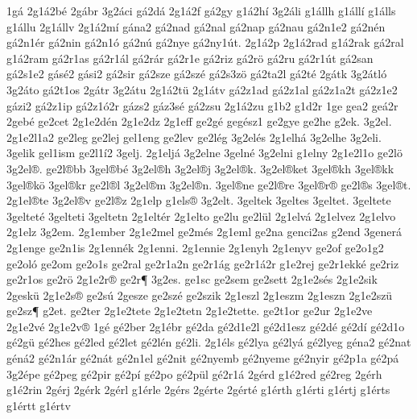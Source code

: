 {1g^^e1
2g1^^e12b^^e9
2g^^e1br
3g2^^e1ci
g^^e12d^^e1
2g1^^e12f
g^^e12gy
g1^^e12h^^ed
3g2^^e1li
g1^^e1llh
g1^^e1ll^^ed
g1^^e1lls
g1^^e1llu
2g1^^e1llv
2g1^^e12m^^ed
g^^e1na2
g^^e12nad
g^^e12nal
g^^e12nap
g^^e12nau
g^^e12n1e2
g^^e12n^^e9n
g^^e12n1^^e9r
g^^e12nin
g^^e12n1^^f3
g^^e12n^^fa
g^^e12nye
g^^e12ny1^^fat.
2g1^^e12p
2g1^^e12rad
g1^^e12rak
g^^e12ral
g1^^e12ram
g^^e12r1as
g^^e12r1^^e1l
g^^e12r^^e1r
g^^e12r1e
g^^e12riz
g^^e12r^^f6
g^^e12ru
g^^e12r1^^fat
g^^e12san
g^^e12s1e2
g^^e1s^^e92
g^^e1si2
g^^e12sir
g^^e12sze
g^^e12sz^^e9
g^^e12s3z^^f6
g^^e12ta2l
g^^e12t^^e9
2g^^e1tk
3g2^^e1tl^^f3
3g2^^e1to
g^^e12t1os
2g^^e1tr
3g2^^e1tu
2g1^^e12t^^fc
2g1^^e1tv
g^^e12z1ad
g^^e12z1al
g^^e12z1a2t
g^^e12z1e2
g^^e1zi2
g^^e12z1ip
g^^e12z1^^f32r
g^^e1zs2
g^^e1z3s^^e9
g^^e12zsu
2g1^^e12zu
g1b2
g1d2r
1ge
gea2
ge^^e12r
2geb^^e9
ge2cet
2g1e2d^^e9n
2g1e2dz
2g1eff
ge2g^^e9
geg^^e9sz1
ge2gye
ge2he
g2ek.
3g2el.
2g1e2l1a2
ge2leg
ge2lej
gel1eng
ge2lev
ge2l^^e9g
3g2el^^e9s
2g1elh^^e1
3g2elhe
3g2eli.
3gelik
gel1ism
ge2l1^^ed2
3gelj.
2g1elj^^e1
3g2elne
3geln^^e9
3g2elni
g1elny
2g1e2l1o
ge2l^^f6
3g2el^^ae.
ge2l^^aebb
3gel^^aeb^^e9
3g2el^^aeh
3g2el^^aej
3g2el^^aek.
3g2el^^aeket
3gel^^aekh
3gel^^aekk
3gel^^aek^^f6
3gel^^aekr
ge2l^^ael
3g2el^^aem
3g2el^^aen.
3gel^^aene
ge2l^^aere
3gel^^aer^^ae
ge2l^^aes
3gel^^aet.
2g1el^^aete
3g2el^^aev
ge2l^^aez
2g1elp
g1els^^ae
3g2elt.
3geltek
3geltes
3geltet.
3geltete
3geltet^^e9
3gelteti
3geltetn
2g1elt^^e9r
2g1elto
ge2lu
ge2l^^fcl
2g1elv^^e1
2g1elvez
2g1elvo
2g1elz
3g2em.
2g1ember
2g1e2mel
ge2m^^e9s
2g1eml
ge2na
genci2as
g2end
3gener^^e1
2g1enge
ge2n1is
2g1enn^^e9k
2g1enni.
2g1ennie
2g1enyh
2g1enyv
ge2of
ge2o1g2
ge2ol^^f3
ge2om
ge2o1s
ge2ral
ge2r1a2n
ge2r1^^e1g
ge2r1^^e12r
g1e2rej
ge2r1ekk^^e9
ge2riz
ge2r1os
ge2r^^f6
2g1e2r^^ae
ge2r^^b6
3g2es.
ge1sc
ge2sem
ge2sett
2g1e2s^^e9s
2g1e2sik
2gesk^^fc
2g1e2s^^ae
ge2s^^fa
2gesze
ge2sz^^e9
ge2szik
2g1eszl
2g1eszm
2g1eszn
2g1e2sz^^fc
ge2sz^^b6
g2et.
ge2ter
2g1e2tete
2g1e2tetn
2g1e2tette.
ge2t1or
ge2ur
2g1e2ve
2g1e2v^^e9
2g1e2v^^ae
1g^^e9
g^^e92ber
2g1^^e9br
g^^e92da
g^^e92d1e2l
g^^e92d1esz
g^^e92d^^e9
g^^e92d^^ed
g^^e92d1o
g^^e92g^^fc
g^^e92hes
g^^e92led
g^^e92let
g^^e92l^^e9n
g^^e92li.
2g1^^e9ls
g^^e92lya
g^^e92ly^^e1
g^^e92lyeg
g^^e9na2
g^^e92nat
g^^e9n^^e12
g^^e92n1^^e1r
g^^e92n^^e1t
g^^e92n1el
g^^e92nit
g^^e92nyemb
g^^e92nyeme
g^^e92nyir
g^^e92p1a
g^^e92p^^e1
3g2^^e9pe
g^^e92peg
g^^e92pir
g^^e92p^^ed
g^^e92po
g^^e92p^^fcl
g^^e92r1^^e1
2g^^e9rd
g1^^e92red
g^^e92reg
2g^^e9rh
g1^^e92rin
2g^^e9rj
2g^^e9rk
2g^^e9rl
g1^^e9rle
2g^^e9rs
2g^^e9rte
2g^^e9rt^^e9
g1^^e9rth
g1^^e9rti
g1^^e9rtj
g1^^e9rts
g1^^e9rtt
g1^^e9rtv
}
